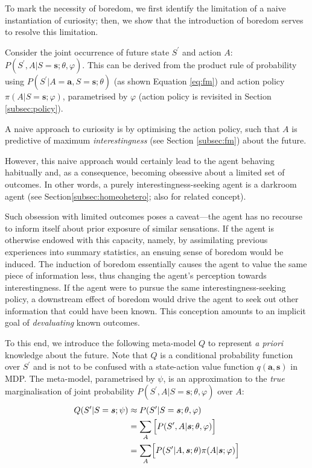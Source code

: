 \documentclass[utf8]{frontiersSCNS}
\newcommand{\bs}{\boldsymbol}
\begin{document}
To mark the necessity of boredom, we first identify the limitation of a naive instantiation of curiosity; then, we show that the introduction of boredom serves to resolve this limitation.

Consider the joint occurrence of future state $S^\prime$ and action $A$: $ P (S^\prime, A|S=\bs{s}; \theta, \varphi)$.  This can be derived from the product rule of probability using $P(S^\prime|A=\bs{a}, S=\bs{s}; \theta)$ (as shown Equation \ref{eq:fm}) and action policy $\pi(A|S=\bs{s}; \varphi)$, parametrised by $\varphi$ (action policy is revisited in Section \ref{subsec:policy}). 

A naive approach to curiosity is by optimising the action policy, such that $A$ is predictive of maximum {\it interestingness} (see Section \ref{subsec:fm}) about the future.

However, this naive approach would certainly lead to the agent behaving habitually and, as a consequence, becoming obsessive about a limited set of outcomes. In other words, a purely interestingness-seeking agent is a darkroom agent (see Section\ref{subsec:homeohetero}; also \citet{darkroom} for related concept).

Such obsession with limited outcomes poses a caveat---the agent has no recourse to inform itself about prior exposure of similar sensations. If the agent is otherwise endowed with this capacity, namely, by assimilating previous experiences into summary statistics, an ensuing sense of boredom would be induced. The induction of boredom essentially causes the agent to value the same piece of information less, thus changing the agent's perception towards interestingness. If the agent were to pursue the same interestingness-seeking policy, a downstream effect of boredom would drive the agent to seek out other information that could have been known. This conception amounts to an implicit goal of {\it devaluating} known outcomes.


To this end, we introduce the following meta-model $Q$ to represent {\it a priori} knowledge about the future. Note that $Q$ is a conditional probability function over $S^\prime$ and is not to be confused with a state-action value function $q(\bs a, \bs s)$ in MDP. The meta-model, parametrised by $\psi$, is an approximation to the {\it true} marginalisation of joint probability $P(S^\prime, A|S=\bs{s}; \theta, \varphi)$ over $A$:
%
	\begin{equation}
	\begin{aligned} \label{eq:mm}
	Q(S^\prime | S=\bs{s}; \psi) & \approx 
		P (S^\prime | S=\bs{s}; \theta, \varphi) \\
		&= \sum_A \Big[ P(S^\prime, A|\bs{s}; \theta, \varphi) \Bigr] \\
		&= \sum_A \Bigl[ P (S^\prime| A, \bs{s}; \theta) \pi(A|\bs{s}; \varphi) \Bigr] \\
	\end{aligned}
	\end{equation}
%
\end{document}
